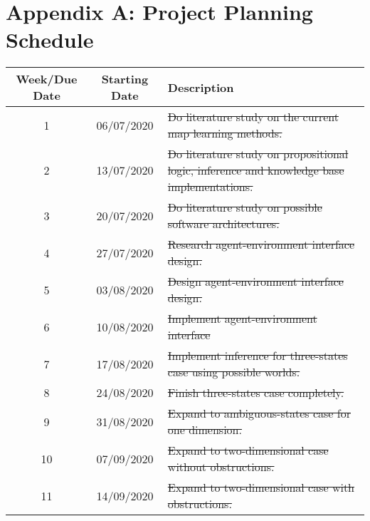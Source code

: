\setcounter{table}{0}
\renewcommand{\thetable}{A.\arabic{table}}

\chapter{Appendix A:  Project Planning Schedule}

 \begin{table}[H]
  \begin{center}
    \begin{tabular}{|c|c|p{8cm}|} 
    \hline
      \textbf{Week/Due Date} & \textbf{Starting Date} & \textbf{Description}\\
      \hline
      \hline
      1 & 06/07/2020 & \sout{Do literature study on the current map learning methods.}\\ \hline
      
      2 & 13/07/2020 & \sout{Do literature study on propositional logic, 
      inference and knowledge base implementations.}\\ \hline
      
      3 & 20/07/2020 & \sout{Do literature study on possible software architectures.}\\ \hline
      
      4 & 27/07/2020 &  \sout{Research agent-environment interface design.} \\ \hline
      
      5  & 03/08/2020 & \sout{Design agent-environment interface design.}  \\ \hline
      
      6 & 10/08/2020 & \sout{Implement agent-environment interface}\\ \hline
      
      7 & 17/08/2020 & \sout{Implement inference for three-states case using possible worlds.} \\ \hline
      
      8 & 24/08/2020 & \sout{Finish three-states case completely.}\\ \hline
      
      9 & 31/08/2020 & \sout{Expand to ambiguous-states case for one dimension.}\\ \hline
      
      10 & 07/09/2020 & \sout{Expand to two-dimensional case without obstructions.}\\ \hline
      
      11 & 14/09/2020 & \sout{Expand to two-dimensional case with obstructions.}\\ \hline
      

\end{tabular}
\end{center}
\end{table}
